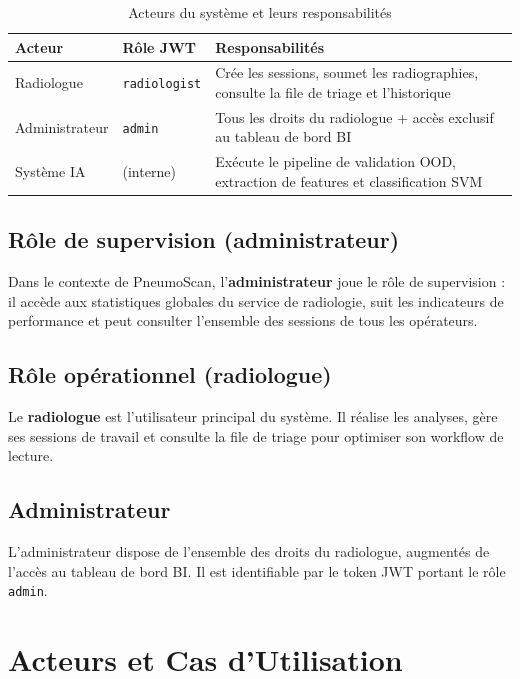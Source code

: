 \documentclass[12pt, a4paper]{report}
\begin{document}
\begin{table}[H]
\centering
\caption{Acteurs du système et leurs responsabilités}
\begin{tabularx}{\textwidth}{L{3cm} L{2.5cm} X}
\toprule
\textbf{Acteur} & \textbf{Rôle JWT} & \textbf{Responsabilités} \\
\midrule
Radiologue & \texttt{radiologist} &
  Crée les sessions, soumet les radiographies, consulte la file de triage et l'historique \\
Administrateur & \texttt{admin} &
  Tous les droits du radiologue + accès exclusif au tableau de bord BI \\
Système IA & (interne) &
  Exécute le pipeline de validation OOD, extraction de features et classification SVM \\
\bottomrule
\end{tabularx}
\end{table}

\subsection{Rôle de supervision (administrateur)}

Dans le contexte de PneumoScan, l'\textbf{administrateur} joue le rôle
de supervision : il accède aux statistiques globales du service de radiologie,
suit les indicateurs de performance et peut consulter l'ensemble des sessions
de tous les opérateurs.

\subsection{Rôle opérationnel (radiologue)}

Le \textbf{radiologue} est l'utilisateur principal du système. Il réalise
les analyses, gère ses sessions de travail et consulte la file de triage
pour optimiser son workflow de lecture.

\subsection{Administrateur}

L'administrateur dispose de l'ensemble des droits du radiologue,
augmentés de l'accès au tableau de bord BI. Il est identifiable par le token
JWT portant le rôle \texttt{admin}.

\section{Acteurs et Cas d'Utilisation}
\end{document}

